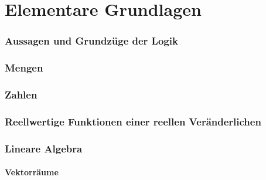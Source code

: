 





\maketitle
\newpage
\tableofcontents
\newpage


\part{Elementare Grundlagen}

\section{Aussagen und Grundzüge der Logik}
%

\section{Mengen}\label{sec:Mengen}
%

\section{Zahlen}
%

\section{Reellwertige Funktionen einer reellen Veränderlichen}
%

\section{Lineare Algebra}

\subsection{Vektorräume}

